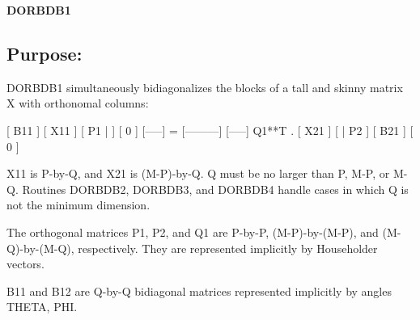 {\bfseries D\+O\+R\+B\+D\+B1} 

\subsection*{Purpose\+: }

\begin{DoxyVerb} DORBDB1 simultaneously bidiagonalizes the blocks of a tall and skinny
 matrix X with orthonomal columns:

                            [ B11 ]
      [ X11 ]   [ P1 |    ] [  0  ]
      [-----] = [---------] [-----] Q1**T .
      [ X21 ]   [    | P2 ] [ B21 ]
                            [  0  ]

 X11 is P-by-Q, and X21 is (M-P)-by-Q. Q must be no larger than P,
 M-P, or M-Q. Routines DORBDB2, DORBDB3, and DORBDB4 handle cases in
 which Q is not the minimum dimension.

 The orthogonal matrices P1, P2, and Q1 are P-by-P, (M-P)-by-(M-P),
 and (M-Q)-by-(M-Q), respectively. They are represented implicitly by
 Householder vectors.

 B11 and B12 are Q-by-Q bidiagonal matrices represented implicitly by
 angles THETA, PHI.\end{DoxyVerb}
 
